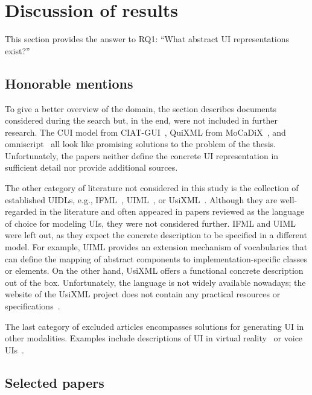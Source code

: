 \section{Discussion of results}\label{sec:review-discussion-of-results}

This section provides the answer to RQ1: \enquote{What abstract UI representations exist?}

\subsection{Honorable mentions}\label{subsec:honorable-mentions}
To give a better overview of the domain, the section describes documents considered during the search but, in the end, were not included in further research.
The CUI model from CIAT-GUI~\cite{Molina2012-my}, QuiXML from MoCaDiX~\cite{Vanderdonckt2019-av}, and omniscript~\cite{Ulusoy2019-jh} all look like promising solutions to the problem of the thesis.
Unfortunately, the papers neither define the concrete UI representation in sufficient detail nor provide additional sources.

The other category of literature not considered in this study is the collection of established UIDLs, e.g., IFML~\cite{Brambilla2014-ln}, UIML~\cite{Abrams1999}, or UsiXML~\cite{Limbourg2005}.
Although they are well-regarded in the literature and often appeared in papers reviewed as the language of choice for modeling UIs, they were not considered further.
IFML and UIML were left out, as they expect the concrete description to be specified in a different model.
For example, UIML provides an extension mechanism of vocabularies that can define the mapping of abstract components to implementation-specific classes or elements.
On the other hand, UsiXML offers a functional concrete description out of the box.
Unfortunately, the language is not widely available nowadays;
the website of the UsiXML project does not contain any practical resources or specifications~.

The last category of excluded articles encompasses solutions for generating UI in other modalities.
Examples include descriptions of UI in virtual reality~\cite{Olmedo2015} or voice UIs~\cite{steinberger2020domain}.

\subsection{Selected papers}\label{subsec:selected-papers}

